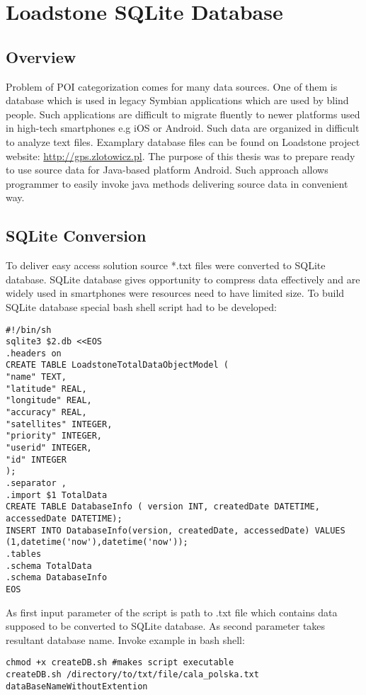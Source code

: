 \chapter{Loadstone SQLite Database}\label{chap.loadstone}

\section{Overview}
Problem of POI categorization comes for many data sources. One of them is database which is used in legacy Symbian applications which are used by blind people. Such applications are difficult to migrate fluently to newer platforms used in high-tech smartphones e.g iOS or Android. Such data are organized in difficult to analyze text files. Examplary database files can be found on Loadstone project website: \url{http://gps.zlotowicz.pl}. The purpose of this thesis was to prepare ready to use source data for Java-based platform Android. Such approach allows programmer to easily invoke java methods delivering source data in convenient way.

\section{SQLite Conversion}
To deliver easy access solution source *.txt files were converted to SQLite database. SQLite database gives opportunity to compress data effectively and are widely used in smartphones were resources need to have limited size. To build SQLite database special bash shell script had to be developed:

\begin{lstlisting}[style=BASH]	
#!/bin/sh
sqlite3 $2.db <<EOS
.headers on
CREATE TABLE LoadstoneTotalDataObjectModel (
"name" TEXT,
"latitude" REAL,
"longitude" REAL,
"accuracy" REAL,
"satellites" INTEGER,
"priority" INTEGER,
"userid" INTEGER,
"id" INTEGER
);
.separator ,
.import $1 TotalData
CREATE TABLE DatabaseInfo ( version INT, createdDate DATETIME, accessedDate DATETIME);
INSERT INTO DatabaseInfo(version, createdDate, accessedDate) VALUES (1,datetime('now'),datetime('now'));
.tables
.schema TotalData
.schema DatabaseInfo
EOS
\end{lstlisting}

As first input parameter of the script is path to .txt file which contains data supposed to be converted to SQLite database. As second parameter takes resultant database name. Invoke example in bash shell:
\begin{lstlisting}[style=BASH]
chmod +x createDB.sh #makes script executable
createDB.sh /directory/to/txt/file/cala_polska.txt dataBaseNameWithoutExtention
\end{lstlisting} 